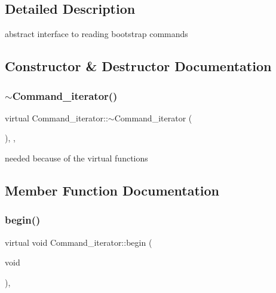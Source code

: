 \subsection{Detailed Description}
abstract interface to reading bootstrap commands 

\subsection{Constructor \& Destructor Documentation}
\mbox{\label{classCommand__iterator_a55b3b7b80a621e1c449aa659c70d6c71}} 
\subsubsection{\texorpdfstring{$\sim$\+Command\+\_\+iterator()}{~Command\_iterator()}}
{\footnotesize\ttfamily virtual Command\+\_\+iterator\+::$\sim$\+Command\+\_\+iterator (\begin{DoxyParamCaption}{ }\end{DoxyParamCaption})\hspace{0.3cm}{\ttfamily [inline]}, {\ttfamily [protected]}, {\ttfamily [virtual]}}

needed because of the virtual functions 

\subsection{Member Function Documentation}
\mbox{\label{classCommand__iterator_a4b17b4b7b81c4bb2a5109eb0d5ab1e3c}} 
\subsubsection{\texorpdfstring{begin()}{begin()}}
{\footnotesize\ttfamily virtual void Command\+\_\+iterator\+::begin (\begin{DoxyParamCaption}\item[{void}]{ }\end{DoxyParamCaption})\hspace{0.3cm}{\ttfamily [inline]}, {\ttfamily [virtual]}}

